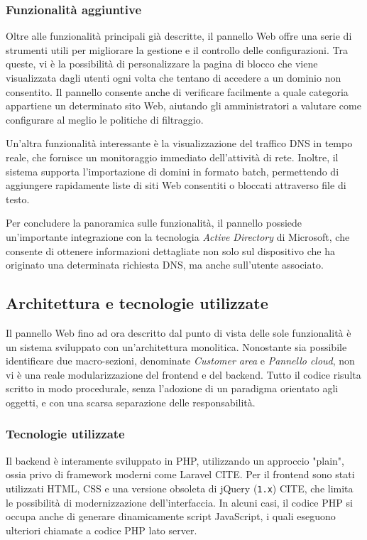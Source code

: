 \subsubsection{Funzionalità aggiuntive}
Oltre alle funzionalità principali già descritte, il pannello Web offre una serie di strumenti utili per migliorare la gestione e il controllo delle configurazioni. Tra queste, vi è la possibilità di personalizzare la pagina di blocco che viene visualizzata dagli utenti ogni volta che tentano di accedere a un dominio non consentito. Il pannello consente anche di verificare facilmente a quale categoria appartiene un determinato sito Web, aiutando gli amministratori a valutare come configurare al meglio le politiche di filtraggio.

Un’altra funzionalità interessante è la visualizzazione del traffico DNS in tempo reale, che fornisce un monitoraggio immediato dell’attività di rete. Inoltre, il sistema supporta l'importazione di domini in formato batch, permettendo di aggiungere rapidamente liste di siti Web consentiti o bloccati attraverso file di testo.

Per concludere la panoramica sulle funzionalità, il pannello possiede un'importante integrazione con la tecnologia \emph{Active Directory} di Microsoft, che consente di ottenere informazioni dettagliate non solo sul dispositivo che ha originato una determinata richiesta DNS, ma anche sull’utente associato.

\subsection{Architettura e tecnologie utilizzate}
Il pannello Web fino ad ora descritto dal punto di vista delle sole funzionalità è un sistema sviluppato con un'architettura monolitica. Nonostante sia possibile identificare due macro-sezioni, denominate \textit{Customer area} e \textit{Pannello cloud}, non vi è una reale modularizzazione del frontend e del backend. Tutto il codice risulta scritto in modo procedurale, senza l’adozione di un paradigma orientato agli oggetti, e con una scarsa separazione delle responsabilità.

\subsubsection{Tecnologie utilizzate}
Il backend è interamente sviluppato in PHP, utilizzando un approccio "plain", ossia privo di framework moderni come Laravel CITE. Per il frontend sono stati utilizzati HTML, CSS e una versione obsoleta di jQuery (\texttt{1.x}) CITE, che limita le possibilità di modernizzazione dell'interfaccia. In alcuni casi, il codice PHP si occupa anche di generare dinamicamente script JavaScript, i quali eseguono ulteriori chiamate a codice PHP lato server.

